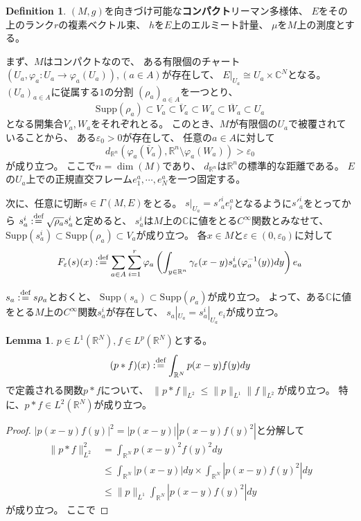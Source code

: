 \documentclass[uplatex]{jsarticle}
\theoremstyle{definition}
\newtheorem{lem}[lem]{Lemma}
\newtheorem{defi}[defi]{Definition}
\newcommand{\Supp}{\mathrm{Supp}}
\newcommand{\ep}{\varepsilon}
\newcommand{\dfn}{:\overset{\mbox{{\scriptsize def}}}{=}}
\newcommand{\C}{\mathbb{C}}
\newcommand{\R}{\mathbb{R}}
\begin{document}
\begin{defi}
  \((M,g)\)を向きづけ可能な\textbf{コンパクト}リーマン多様体、
  \(E\)をその上のランク\(r\)の複素ベクトル束、
  \(h\)を\(E\)上のエルミート計量、
  \(\mu\)を\(M\)上の測度とする。

  まず、\(M\)はコンパクトなので、
  ある有限個のチャート\((U_a,\varphi_a:U_a\to \varphi_a(U_a)), (a\in A)\)が存在して、
  \(E|_{U_a}\cong U_a\times \C^N\)となる。
  \((U_a)_{a\in A}\)に従属する\(1\)の分割
  \((\rho_a)_{a\in A}\)を一つとり、
  \[\Supp(\rho_a) \subset V_a \subset \overline{V}_a \subset W_a\subset \overline{W}_a\subset U_a\]
  となる開集合\(V_a,W_a\)をそれぞれとる。
  このとき、\(M\)が有限個の\(U_a\)で被覆されていることから、
  ある\(\ep_0 > 0\)が存在して、
  任意の\(a\in A\)に対して
  \[d_{\R^n}(\varphi_a(\overline{V}_a),\R^n\setminus \varphi_a(W_a)) > \ep_0\]
  が成り立つ。
  ここで\(n = \dim (M)\)であり、
  \(d_{\R^n}\)は\(\R^n\)の標準的な距離である。
  \(E\)の\(U_a\)上での正規直交フレーム\(e_1^a,\cdots,e_N^a\)を一つ固定する。

  次に、任意に切断\(s\in \Gamma(M,E)\)をとる。
  \(s|_{U_a} = {s'}_a^ie_i^a\)となるように\({s'}_a^i\)をとってから
  \(s_a^i\dfn \sqrt{\rho_a}s_a^i\)と定めると、
  \(s_a^i\)は\(M\)上の\(\C\)に値をとる\(C^{\infty}\)関数とみなせて、
  \(\Supp(s_a^i)\subset \Supp(\rho_a)\subset V_a\)が成り立つ。
  各\(x\in M\)と\(\ep\in (0,\ep_0)\)に対して
  \[
  F_{\ep}(s)(x) \dfn \sum_{a\in A}\sum_{i=1}^r
  \varphi_a\left(\int_{y\in \R^n}\gamma_{\ep}(x-y)s_a^i(\varphi_a^{-1}(y))dy\right)e_a
  \]

  \(s_a \dfn s\rho_a\)とおくと、
  \(\Supp(s_a) \subset \Supp(\rho_a)\)が成り立つ。
  よって、ある\(\C\)に値をとる\(M\)上の\(C^\infty\)関数\(s_a^i\)が存在して、
  \(s_a|_{U_a} = s_a^i|_{U_a}e_i\)が成り立つ。

\end{defi}


\begin{lem}
  \(p\in L^1(\R^N), f\in L^p(\R^N)\)とする。
  \[
  (p*f)(x) \dfn \int_{\R^N}p(x-y)f(y)dy
  \]
  で定義される関数\(p*f\)について、
  \(\|p*f\|_{L^2} \leq \|p\|_{L^1}\|f\|_{L^2}\)が成り立つ。
  特に、\(p*f\in L^2(\R^N)\)が成り立つ。
\end{lem}

\begin{proof}
  \(|p(x-y)f(y)|^2 = |p(x-y)||p(x-y)f(y)^2|\)と分解して
  \begin{align*}
    \|p*f\|_{L^2}^2
    &= \int_{\R^N}p(x-y)^2f(y)^2dy \\
    &\leq \int_{\R^N}|p(x-y)|dy \times \int_{\R^N}|p(x-y)f(y)^2|dy \\
    &\leq \|p\|_{L^1} \int_{\R^N}|p(x-y)f(y)^2|dy
  \end{align*}
  が成り立つ。
  ここで
\end{proof}
\end{document}
